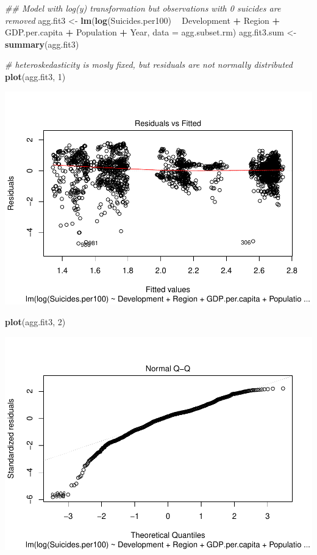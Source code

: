 \documentclass[11pt,]{article}
\newenvironment{Shaded}{\begin{snugshade}}{\end{snugshade}}
\newcommand{\CommentTok}[1]{\textcolor[rgb]{0.56,0.35,0.01}{\textit{#1}}}
\newcommand{\DataTypeTok}[1]{\textcolor[rgb]{0.13,0.29,0.53}{#1}}
\newcommand{\DecValTok}[1]{\textcolor[rgb]{0.00,0.00,0.81}{#1}}
\newcommand{\KeywordTok}[1]{\textcolor[rgb]{0.13,0.29,0.53}{\textbf{#1}}}
\newcommand{\NormalTok}[1]{#1}
\newcommand{\OperatorTok}[1]{\textcolor[rgb]{0.81,0.36,0.00}{\textbf{#1}}}
\newcommand{\StringTok}[1]{\textcolor[rgb]{0.31,0.60,0.02}{#1}}
\begin{document}
\begin{Shaded}
\begin{Highlighting}[]
\CommentTok{## Model with log(y) transformation but observations with 0 suicides are removed}
\NormalTok{agg.fit3 <-}\StringTok{ }\KeywordTok{lm}\NormalTok{(}\KeywordTok{log}\NormalTok{(Suicides.per100) }\OperatorTok{~}\StringTok{ }\NormalTok{Development }\OperatorTok{+}\StringTok{ }\NormalTok{Region }\OperatorTok{+}\StringTok{ }\NormalTok{GDP.per.capita }\OperatorTok{+}\StringTok{ }\NormalTok{Population }\OperatorTok{+}\StringTok{ }\NormalTok{Year, }\DataTypeTok{data =}\NormalTok{ agg.subset.rm)}
\NormalTok{agg.fit3.sum <-}\StringTok{ }\KeywordTok{summary}\NormalTok{(agg.fit3)}

\CommentTok{# heteroskedasticity is mosly fixed, but residuals are not normally distributed}
\KeywordTok{plot}\NormalTok{(agg.fit3, }\DecValTok{1}\NormalTok{)}
\end{Highlighting}
\end{Shaded}

\includegraphics{An-Analysis-of-Suicide-Data_files/figure-latex/unnamed-chunk-6-1.pdf}

\begin{Shaded}
\begin{Highlighting}[]
\KeywordTok{plot}\NormalTok{(agg.fit3, }\DecValTok{2}\NormalTok{)}
\end{Highlighting}
\end{Shaded}

\includegraphics{An-Analysis-of-Suicide-Data_files/figure-latex/unnamed-chunk-6-2.pdf}
\end{document}
